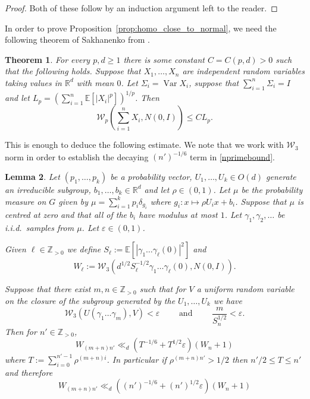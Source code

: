 \documentclass[10pt, english,oneside,reqno]{amsart}
\theoremstyle{plain}
\newtheorem{theorem}{Theorem}[section]
\newtheorem{lemma}[theorem]{Lemma}
\theoremstyle{remark}
\numberwithin{equation}{section}
\numberwithin{figure}{section}
\DeclareMathOperator{\var}{Var}
\newcommand{\Z}{\mathbb{Z}}
\newcommand{\R}{\mathbb{R}}
\begin{document}
\begin{proof}
	Both of these follow by an induction argument left to the reader.
\end{proof}

In order to prove Proposition~\ref{prop:homo_close_to_normal}, we need the following theorem of Sakhanenko from \cite{sakhanenko1985estimates}.

\begin{theorem} \label{theo:l_p_wasserstien_p}
    For every $p, d \geq 1$ there is some constant $C = C(p, d) >0$ such that the following holds. Suppose that $X_1, \dots, X_n$ are independent random variables taking values in $\R^d$ with mean $0$. Let $\Sigma_i = \var X_i$, suppose that $\sum_{i=1}^n \Sigma_i = I$ and let $L_p = (\sum_{i=1}^n \mathbb{E}[|X_i|^p])^{1/p}$. Then
    \begin{equation*}
        \mathcal{W}_p\left(\sum_{i=1}^n X_i, N(0, I)\right) \leq C L_p.
    \end{equation*}
\end{theorem}

This is enough to deduce the following estimate. We note that we work with $\mathcal{W}_3$ norm in order to establish the decaying $(n')^{-1/6}$ term in \eqref{nprimebound}.

\begin{lemma} \label{lemm:w3_estimate}
	Let $(p_1, \dots, p_k)$ be a probability vector, $U_1, \dots, U_k \in O(d)$ generate an irreducible subgroup, $b_1, \dots, b_k \in \R^d$ and let $\rho \in (0, 1)$. Let $\mu$ be the probability measure on $G$ given by $\mu = \sum_{i=1}^{k} p_i \delta_{g_i}$ where $g_i: x \mapsto \rho U_i x + b_i$. Suppose that $\mu$ is centred at zero and that all of the $b_i$ have modulus at most $1$. Let $\gamma_1, \gamma_2, \dots$ be i.i.d.\ samples from $\mu$. Let $\varepsilon \in (0, 1)$.
	
	Given $\ell \in \Z_{>0}$ we define $S_{\ell} := \mathbb{E}[|\gamma_1 \dots \gamma_{\ell}(0)|^2]$ and
	\begin{equation*}
		W_{\ell} := \mathcal{W}_3 \left( d^{1/2} S_{\ell}^{-1/2} \gamma_1 \dots \gamma_{\ell}(0), N(0, I) \right).
	\end{equation*}	
	
	Suppose that there exist $m, n \in \Z_{>0}$ such that for $V$ a uniform random variable on the closure of the subgroup generated by the $U_1, \ldots , U_k$ we have
	\begin{equation*}
        \mathcal{W}_3(U(\gamma_1 \dots \gamma_m), V) < \varepsilon \quad\quad \text{ and }\quad \quad  \frac{m}{S_n^{1/2}} < \varepsilon.
    \end{equation*}
    Then for $n' \in \Z_{>0}$,
    \begin{equation}
        W_{(m+n) n'} \ll_d (T^{-1/6} + T^{1/2} \varepsilon) (W_n + 1)
    \end{equation}
    where $T := \sum_{i=0}^{n'-1} \rho^{(m+n) i}$. In particular if $\rho^{(m+n) n'} > 1/2$ then $n'/2 \leq T \leq n'$ and therefore
    \begin{equation}\label{nprimebound}
        W_{(m+n) n'} \ll_d ((n')^{-1/6} + (n')^{1/2} \varepsilon) (W_n + 1)
    \end{equation}
\end{lemma}
\end{document}
